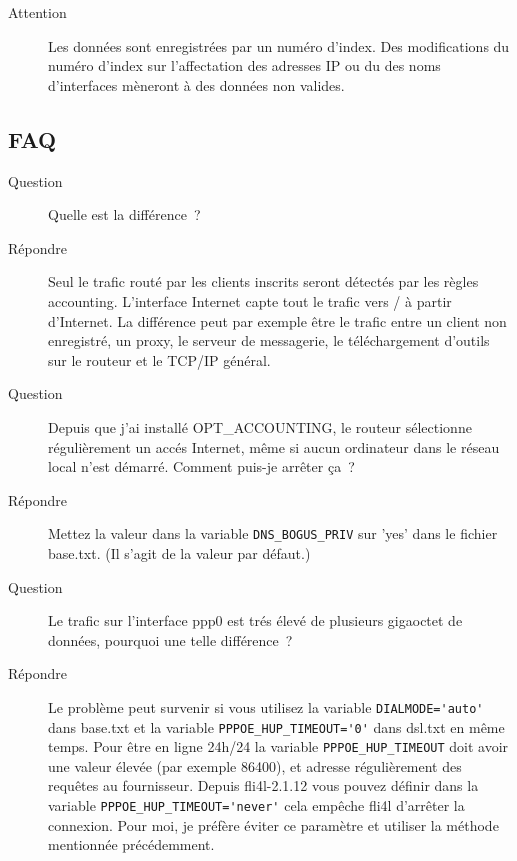\begin{description}
\item[Attention] Les données sont enregistrées par un numéro d'index. Des
modifications du numéro d'index sur l'affectation des adresses IP ou du des
noms d'interfaces mèneront à des données non valides.
\end{description}

\subsection{FAQ}
\begin{description}
\item[Question] Quelle est la différence~?
\item[Répondre] Seul le trafic routé par les clients inscrits seront détectés
par les règles accounting. L'interface Internet capte tout le trafic vers / à
partir d'Internet. La différence peut par exemple être le trafic entre un client
non enregistré, un proxy, le serveur de messagerie, le téléchargement d'outils
sur le routeur et le TCP/IP général.
\end{description}

\begin{description}
\item[Question] Depuis que j'ai installé OPT\_ACCOUNTING, le routeur sélectionne
régulièrement un accés Internet, même si aucun ordinateur dans le réseau local
n'est démarré. Comment puis-je arrêter ça~?
\item[Répondre] Mettez la valeur dans la variable \verb*?DNS_BOGUS_PRIV? sur
'yes' dans le fichier base.txt. (Il s'agit de la valeur par défaut.)
\end{description}

\begin{description}
\item[Question] Le trafic sur l'interface ppp0 est trés élevé de plusieurs
gigaoctet de données, pourquoi une telle différence~?
\item[Répondre] Le problème peut survenir si vous utilisez la variable
\verb*?DIALMODE='auto'? dans base.txt et la variable \verb*?PPPOE_HUP_TIMEOUT='0'?
dans dsl.txt en même temps. Pour être en ligne 24h/24 la variable
\verb*?PPPOE_HUP_TIMEOUT? doit avoir une valeur élevée (par exemple 86400), et
adresse régulièrement des requêtes au fournisseur. Depuis fli4l-2.1.12 vous
pouvez définir dans la variable \verb*?PPPOE_HUP_TIMEOUT='never'? cela empêche
fli4l d'arrêter la connexion. Pour moi, je préfère éviter ce paramètre et
utiliser la méthode mentionnée précédemment.
\end{description}
